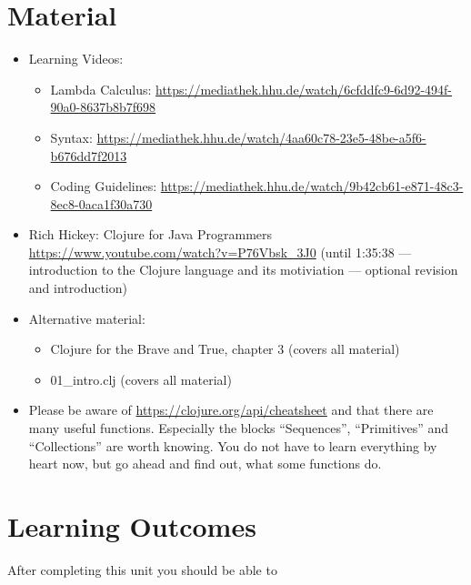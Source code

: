 \documentclass[11pt,a4paper]{article}
\begin{document}

\section{Material} 

\begin{itemize}
    \item Learning Videos: 
        \begin{itemize}
            \item Lambda Calculus: \url{https://mediathek.hhu.de/watch/6cfddfc9-6d92-494f-90a0-8637b8b7f698}
            \item Syntax: \url{https://mediathek.hhu.de/watch/4aa60c78-23e5-48be-a5f6-b676dd7f2013}
            \item Coding Guidelines: \url{https://mediathek.hhu.de/watch/9b42cb61-e871-48c3-8ec8-0aca1f30a730}
        \end{itemize}
    \item Rich Hickey: Clojure for Java Programmers \url{https://www.youtube.com/watch?v=P76Vbsk_3J0} (until 1:35:38 --- introduction to the Clojure language and its motiviation --- optional revision and introduction)
    \item Alternative material:
        \begin{itemize}
            \item Clojure for the Brave and True, chapter 3 (covers all material)
            \item 01\_intro.clj (covers all material)
        \end{itemize}
    \item Please be aware of \url{https://clojure.org/api/cheatsheet} and that there are many useful functions.
        Especially the blocks ``Sequences'', ``Primitives'' and ``Collections'' are worth knowing.
        You do not have to learn everything by heart now, but go ahead and find out, what some functions do.
\end{itemize}

\section{Learning Outcomes}

After completing this unit you should be able to
\end{document}
